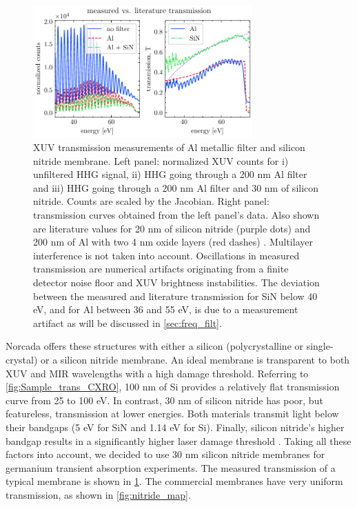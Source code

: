 \begin{figure}
	\centering
	\includegraphics[width=0.75\textwidth]{figures/chap4/SiN_Al_transmission.pdf}
	\caption{XUV transmission measurements of Al metallic filter and silicon nitride membrane. Left panel: normalized XUV counts for i) unfiltered HHG signal, ii) HHG going through a 200 nm Al filter and iii) HHG going through a 200 nm Al filter and 30 nm of silicon nitride. Counts are scaled by the Jacobian. Right panel: transmission curves obtained from the left panel's data. Also shown are literature values for 20 nm of silicon nitride (purple dots) and 200 nm of Al with two 4 nm oxide layers (red dashes) \cite{gulliksonCXROXRayInteractions}. Multilayer interference is not taken into account. Oscillations in measured transmission are numerical artifacts originating from a finite detector noise floor and XUV brightness instabilities. The deviation between the measured and literature transmission for SiN below 40 eV, and for Al between 36 and 55 eV, is due to a measurement artifact as will be discussed in \cref{sec:freq_filt}.}
	\label{fig:SiN_Al_transmission}
\end{figure}

Norcada offers these structures with either a silicon (polycrystalline or single-crystal) or a silicon nitride membrane. An ideal membrane is transparent to both XUV and MIR wavelengths with a high damage threshold. Referring to \cref{fig:Sample_trans_CXRO}, 100 nm of Si provides a relatively flat transmission curve from 25 to 100 eV. In contrast, 30 nm of silicon nitride has poor, but featureless, transmission at lower energies. Both materials transmit light below their bandgaps (5 eV for SiN and 1.14 eV for Si). Finally, silicon nitride's higher bandgap results in a significantly higher laser damage threshold \cite{gamalyAblationSolidsFemtosecond2002,austinFemtosecondLaserDamage2018,keldyshIonizationFieldStrong1965}. Taking all these factors into account, we decided to use 30 nm silicon nitride membranes for germanium transient absorption experiments. The measured transmission of a typical membrane is shown in \cref{fig:SiN_Al_transmission}. The commercial membranes have very uniform transmission, as shown in \cref{fig:nitride_map}.

